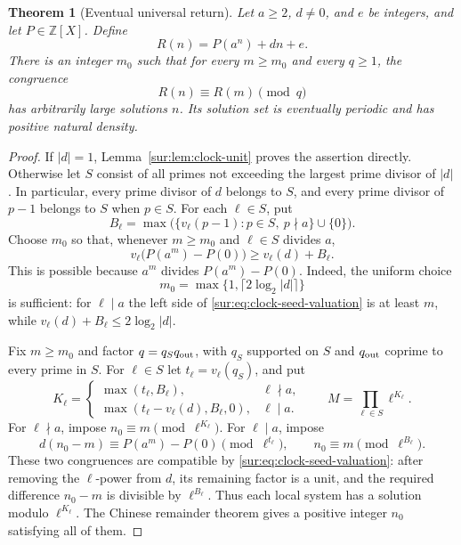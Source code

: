 \documentclass[11pt,a4paper]{article}
\newtheorem{theorem}{Theorem}[section]
\theoremstyle{definition}
\theoremstyle{remark}
\numberwithin{equation}{section}
\begin{document}
\begin{theorem}[Eventual universal return]\label{sur:thm:clock-return}
Let $a\ge2$, $d\ne0$, and $e$ be integers, and let
$P\in\mathbb Z[X]$. Define
\[
 R(n)=P(a^n)+dn+e.
\]
There is an integer $m_0$ such that for every $m\ge m_0$ and every
$q\ge1$, the congruence
\begin{equation}\label{sur:eq:clock-return}
 R(n)\equiv R(m)\pmod q
\end{equation}
has arbitrarily large solutions $n$. Its solution set is eventually
periodic and has positive natural density.
\end{theorem}
\begin{proof}
If $|d|=1$, Lemma~\ref{sur:lem:clock-unit} proves the assertion directly.
Otherwise let $S$ consist of all primes not exceeding the largest prime
divisor of $|d|$. In particular, every prime divisor of $d$ belongs to
$S$, and every prime divisor of $p-1$ belongs to $S$ when $p\in S$.
For each $\ell\in S$, put
\[
 B_\ell=\max\bigl(\{v_\ell(p-1):p\in S,\ p\nmid a\}\cup\{0\}\bigr).
\]
Choose $m_0$ so that, whenever $m\ge m_0$ and $\ell\in S$ divides $a$,
\begin{equation}\label{sur:eq:clock-seed-valuation}
 v_\ell\bigl(P(a^m)-P(0)\bigr)\ge v_\ell(d)+B_\ell.
\end{equation}
This is possible because $a^m$ divides $P(a^m)-P(0)$.
Indeed, the uniform choice
\[
 m_0=\max\{1,\lceil 2\log_2|d|\rceil\}
\]
is sufficient: for $\ell\mid a$ the left side of
\eqref{sur:eq:clock-seed-valuation} is at least $m$, while
$v_\ell(d)+B_\ell\le2\log_2|d|$.

Fix $m\ge m_0$ and factor $q=q_Sq_{\rm out}$, with $q_S$ supported
on $S$ and $q_{\rm out}$ coprime to every prime in $S$. For
$\ell\in S$ let $t_\ell=v_\ell(q_S)$, and put
\[
 K_\ell=
 \begin{cases}
 \max(t_\ell,B_\ell),&\ell\nmid a,\\
 \max(t_\ell-v_\ell(d),B_\ell,0),&\ell\mid a.
 \end{cases}
 \qquad M=\prod_{\ell\in S}\ell^{K_\ell}.
\]
For $\ell\nmid a$, impose $n_0\equiv m\pmod{\ell^{K_\ell}}$.
For $\ell\mid a$, impose
\begin{equation}\label{sur:eq:clock-local-system}
 d(n_0-m)\equiv P(a^m)-P(0)\pmod{\ell^{t_\ell}},
 \qquad n_0\equiv m\pmod{\ell^{B_\ell}}.
\end{equation}
These two congruences are compatible by
\eqref{sur:eq:clock-seed-valuation}: after removing the $\ell$-power
from $d$, its remaining factor is a unit, and the required difference
$n_0-m$ is divisible by $\ell^{B_\ell}$. Thus each local system has a
solution modulo $\ell^{K_\ell}$. The Chinese remainder theorem gives
a positive integer $n_0$ satisfying all of them.


\end{proof}
\end{document}
